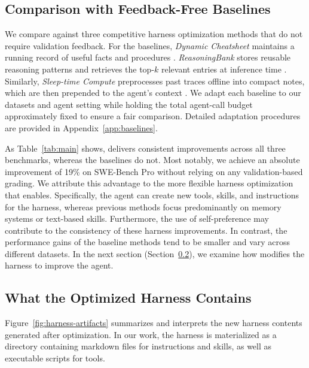 \subsection{Comparison with Feedback-Free Baselines}

We compare \method{} against three competitive harness optimization methods that do not require validation feedback.
For the baselines, \textit{Dynamic Cheatsheet} maintains a running record of useful facts and procedures \citep{suzgun2025dynamiccheatsheet}.
\textit{ReasoningBank} stores reusable reasoning patterns and retrieves the top-$k$ relevant entries at inference time \citep{ouyang2026reasoningbank}.
Similarly, \textit{Sleep-time Compute} preprocesses past traces offline into compact notes, which are then prepended to the agent's context \citep{lin2025sleeptime}.
We adapt each baseline to our datasets and agent setting while holding the total agent-call budget approximately fixed to ensure a fair comparison.
Detailed adaptation procedures are provided in Appendix~\ref{app:baselines}.

As Table~\ref{tab:main} shows, \method{} delivers consistent improvements across all three benchmarks, whereas the baselines do not.
Most notably, we achieve an absolute improvement of 19\% on SWE-Bench Pro without relying on any validation-based grading.
We attribute this advantage to the more flexible harness optimization that \method{} enables.
Specifically, the agent can create new tools, skills, and instructions for the harness, whereas previous methods focus predominantly on memory systems or text-based skills.
Furthermore, the use of self-preference may contribute to the consistency of these harness improvements.
In contrast, the performance gains of the baseline methods tend to be smaller and vary across different datasets.
In the next section (Section~\ref{sec:case-study}), we examine how \method{} modifies the harness to improve the agent.




\subsection{What the Optimized Harness Contains}
\label{sec:case-study}

Figure~\ref{fig:harness-artifacts} summarizes and interprets the new harness contents generated after \method{} optimization.
In our work, the harness is materialized as a directory containing markdown files for instructions and skills, as well as executable scripts for tools.

